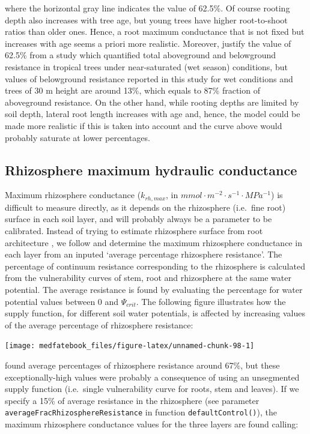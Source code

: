 \documentclass[]{book}
\begin{document}
where the horizontal gray line indicates the value of 62.5\%. Of course
rooting depth also increases with tree age, but young trees have higher
root-to-shoot ratios than older ones. Hence, a root maximum conductance
that is not fixed but increases with age seems a priori more realistic.
Moreover, \citet{Christoffersen2016} justify the value of 62.5\% from a
study which quantified total aboveground and belowground resistance in
tropical trees \citep{Fisher2006} under near-saturated (wet season)
conditions, but values of belowground resistance reported in this study
for wet conditions and trees of 30 m height are around 13\%, which
equals to 87\% fraction of aboveground resistance. On the other hand,
while rooting depths are limited by soil depth, lateral root length
increases with age and, hence, the model could be made more realistic if
this is taken into account and the curve above would probably saturate
at lower percentages.

\subsection{Rhizosphere maximum hydraulic
conductance}\label{rhizosphere-maximum-hydraulic-conductance}

Maximum rhizosphere conductance (\(k_{rh, max}\), in
\(mmol \cdot m^{-2} \cdot s^{-1} \cdot MPa^{-1}\)) is difficult to
measure directly, as it depends on the rhizosphere (i.e.~fine root)
surface in each soil layer, and will probably always be a parameter to
be calibrated. Instead of trying to estimate rhizosphere surface from
root architecture \citep{Sperry1998}, we follow \citet{Sperry2016a} and
determine the maximum rhizosphere conductance in each layer from an
inputed `average percentage rhizosphere resistance'. The percentage of
continuum resistance corresponding to the rhizosphere is calculated from
the vulnerability curves of stem, root and rhizosphere at the same water
potential. The average resistance is found by evaluating the percentage
for water potential values between 0 and \(\Psi_{crit}\). The following
figure illustrates how the supply function, for different soil water
potentials, is affected by increasing values of the average percentage
of rhizosphere resistance:

\begin{center}\texttt{[image: medfatebook\_files/figure-latex/unnamed-chunk-98-1]} \end{center}

\citet{Sperry2016a} found average percentages of rhizosphere resistance
around 67\%, but these exceptionally-high values were probably a
consequence of using an unsegmented supply function (i.e.~single
vulnerability curve for roots, stem and leaves). If we specify a 15\% of
average resistance in the rhizosphere (see parameter
\texttt{averageFracRhizosphereResistance} in function
\texttt{defaultControl()}), the maximum rhizosphere conductance values
for the three layers are found calling:
\end{document}
